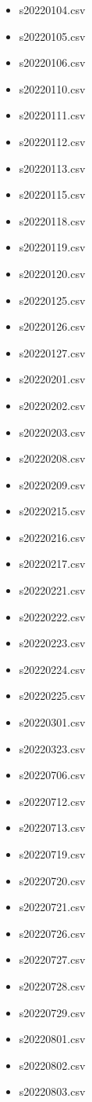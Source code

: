 \documentclass[a4paper,12pt,twoside]{book}
\begin{document}
\begin{itemize}
  \item s20220104.csv
  \item s20220105.csv
  \item s20220106.csv
  \item s20220110.csv
  \item s20220111.csv
  \item s20220112.csv
  \item s20220113.csv
  \item s20220115.csv
  \item s20220118.csv
  \item s20220119.csv
  \item s20220120.csv
  \item s20220125.csv
  \item s20220126.csv
  \item s20220127.csv
  \item s20220201.csv
  \item s20220202.csv
  \item s20220203.csv
  \item s20220208.csv
  \item s20220209.csv
  \item s20220215.csv
  \item s20220216.csv
  \item s20220217.csv
  \item s20220221.csv
  \item s20220222.csv
  \item s20220223.csv
  \item s20220224.csv
  \item s20220225.csv
  \item s20220301.csv
  \item s20220323.csv
  \item s20220706.csv
  \item s20220712.csv
  \item s20220713.csv
  \item s20220719.csv
  \item s20220720.csv
  \item s20220721.csv
  \item s20220726.csv
  \item s20220727.csv
  \item s20220728.csv
  \item s20220729.csv
  \item s20220801.csv
  \item s20220802.csv
  \item s20220803.csv

\end{itemize}
\end{document}
